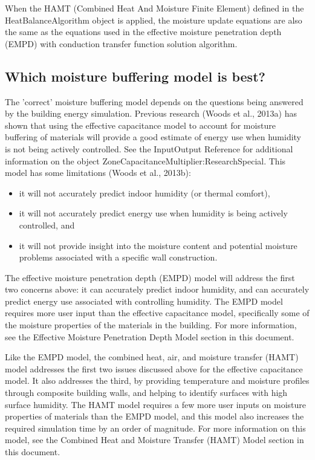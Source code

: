 When the HAMT (Combined Heat And Moisture Finite Element) defined in the HeatBalanceAlgorithm object is applied, the moisture update equations are also the same as the equations used in the effective moisture penetration depth (EMPD) with conduction transfer function solution algorithm.

\subsection{Which moisture buffering model is best?}

The 'correct' moisture buffering model depends on the questions being answered by the building energy simulation. Previous research (Woods et al., 2013a) has shown that using the effective capacitance model to account for moisture buffering of materials will provide a good estimate of energy use when humidity is not being actively controlled. See the InputOutput Reference for additional information on the object ZoneCapacitanceMultiplier:ResearchSpecial. This model has some limitations (Woods et al., 2013b):\\

\begin{itemize}
	\item it will not accurately predict indoor humidity (or thermal comfort),
	\item it will not accurately predict energy use when humidity is being actively controlled, and
	\item it will not provide insight into the moisture content and potential moisture problems associated with a specific wall construction.
\end{itemize}

The effective moisture penetration depth (EMPD) model will address the first two concerns above: it can accurately predict indoor humidity, and can accurately predict energy use associated with controlling humidity. The EMPD model requires more user input than the effective capacitance model, specifically  some of the moisture properties of the materials in the building. For more information, see the Effective Moisture Penetration Depth Model section in this document.

Like the EMPD model, the combined heat, air, and moisture transfer (HAMT) model addresses the first two issues discussed above for the effective capacitance model. It also addresses the third, by providing temperature and moisture profiles through composite building walls, and helping to identify surfaces with high surface humidity. The HAMT model requires a few more user inputs on moisture properties of materials than the EMPD model, and this model also increases the required simulation time by an order of magnitude. For more information on this model, see the Combined Heat and Moisture Transfer (HAMT) Model section in this document.

